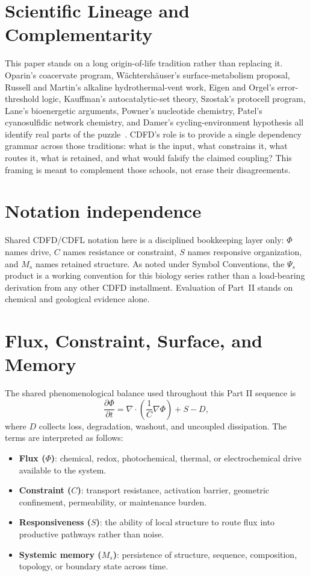 \documentclass[11pt,a4paper]{article}
\begin{document}
\section{Scientific Lineage and Complementarity}
This paper stands on a long origin-of-life tradition rather than replacing it. Oparin's coacervate program, Wächtershäuser's surface-metabolism proposal, Russell and Martin's alkaline hydrothermal-vent work, Eigen and Orgel's error-threshold logic, Kauffman's autocatalytic-set theory, Szostak's protocell program, Lane's bioenergetic arguments, Powner's nucleotide chemistry, Patel's cyanosulfidic network chemistry, and Damer's cycling-environment hypothesis all identify real parts of the puzzle~\cite{Wachtershauser1988,Russell1994,Martin2007,Eigen1971,Orgel1963,Kauffman1986,Szostak2010,Lane2010,Powner2009,Patel2015,Damer2020}. CDFD's role is to provide a single dependency grammar across those traditions: what is the input, what constrains it, what routes it, what is retained, and what would falsify the claimed coupling? This framing is meant to complement those schools, not erase their disagreements.

\section{Notation independence}
Shared CDFD/CDFL notation here is a disciplined bookkeeping layer only: $\Phi$ names drive, $C$ names resistance or constraint, $S$ names responsive organization, and $M_s$ names retained structure. As noted under Symbol Conventions, the $\Psi_s$ product is a working convention for this biology series rather than a load-bearing derivation from any other CDFD installment. Evaluation of Part~II stands on chemical and geological evidence alone.

\section{Flux, Constraint, Surface, and Memory}
The shared phenomenological balance used throughout this Part II sequence is
\begin{equation}
 \frac{\partial \Phi}{\partial t}
 =
 \nabla \cdot \left(\frac{1}{C}\nabla\Phi\right)+S-D,
 \label{eq:flux-balance}
\end{equation}
where $D$ collects loss, degradation, washout, and uncoupled dissipation. The terms are interpreted as follows:
\begin{itemize}
 \item \textbf{Flux ($\Phi$)}: chemical, redox, photochemical, thermal, or electrochemical drive available to the system.
 \item \textbf{Constraint ($C$)}: transport resistance, activation barrier, geometric confinement, permeability, or maintenance burden.
 \item \textbf{Responsiveness ($S$)}: the ability of local structure to route flux into productive pathways rather than noise.
 \item \textbf{Systemic memory ($M_s$)}: persistence of structure, sequence, composition, topology, or boundary state across time.
\end{itemize}
\end{document}
